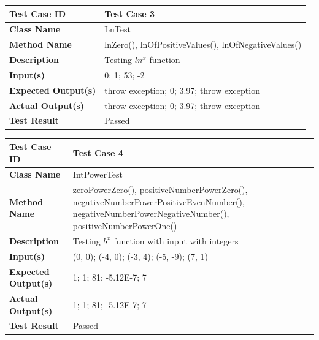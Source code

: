 \documentclass[11pt]{article}
\begin{document}
\begin{center}
    \begin{tabular}{|p{4cm}|p{11cm}| }
    \hline
    \textbf{Test Case ID} & Test Case 3\\ \hline 
    \textbf{Class Name} &  LnTest\\ \hline 
    \textbf{Method Name} & lnZero(), lnOfPositiveValues(), lnOfNegativeValues() \\ \hline 
    \textbf{Description} & Testing $ln^x$ function \\ \hline
    \textbf{Input(s)} & 0; 1; 53; -2\\ \hline
    \textbf{Expected Output(s)} & throw exception; 0; 3.97; throw exception\\ \hline
    \textbf{Actual Output(s)} &throw exception; 0; 3.97; throw exception\\ \hline
    \textbf{Test Result} & Passed\\ \hline
\end{tabular}
\end{center}

\begin{center}
    \begin{tabular}{|p{4cm}|p{11cm}| }
    \hline
    \textbf{Test Case ID} & Test Case 4\\ \hline 
    \textbf{Class Name} &  IntPowerTest\\ \hline 
    \textbf{Method Name} & zeroPowerZero(), positiveNumberPowerZero(), negativeNumberPowerPositiveEvenNumber(), negativeNumberPowerNegativeNumber(), positiveNumberPowerOne() \\ \hline 
    \textbf{Description} & Testing $b^x$ function with input with integers\\ \hline
    \textbf{Input(s)} & (0, 0); (-4, 0); (-3, 4); (-5, -9); (7, 1)\\ \hline
    \textbf{Expected Output(s)} & 1; 1; 81; -5.12E-7; 7\\ \hline
    \textbf{Actual Output(s)} & 1; 1; 81; -5.12E-7; 7\\ \hline
    \textbf{Test Result} & Passed\\ \hline
\end{tabular}
\end{center}
\end{document}
